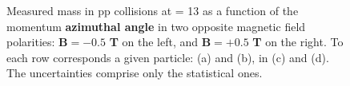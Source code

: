 \begin{figure}[!p]
\hspace*{-1.5cm}
\hspace*{-1.5cm}
\caption{Measured mass in pp collisions at \sqrtS = 13 \tev as a function of the momentum \textbf{azimuthal angle} in two opposite magnetic field polarities: $\mathbf{B = -0.5}$ \textbf{T} on the left, and $\mathbf{B=+0.5}$ \textbf{T} on the right. To each row corresponds a given particle: \rmLambda (a) and (b), \rmXi in (c) and (d). The uncertainties comprise only the statistical ones.}
	\label{fig:MassVsPhiVsB}
\end{figure}

